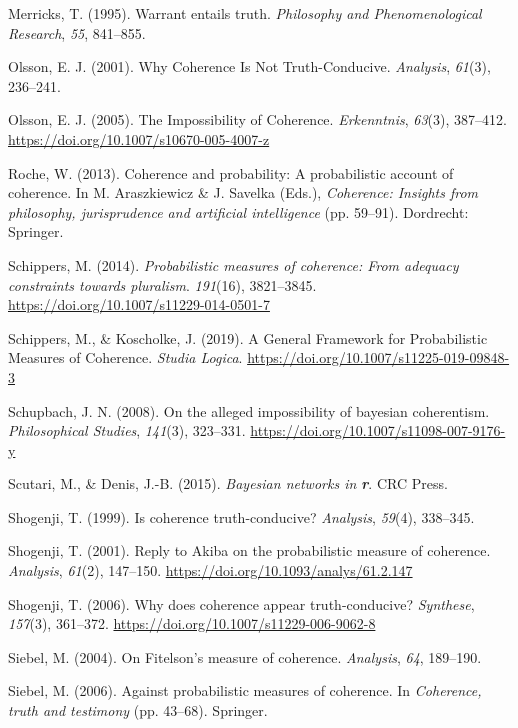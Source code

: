 \documentclass[
  10pt,
]{scrartcl}
\newlength{\cslhangindent}
\newlength{\cslentryspacingunit} %
\newenvironment{CSLReferences}[2] %
 {%
  \setlength{\parindent}{0pt}
  \ifodd #1
  \let\oldpar\par
  \def\par{\hangindent=\cslhangindent\oldpar}
  \fi
  \setlength{\parskip}{#2\cslentryspacingunit}
 }%
 {}
\begin{document}
\begin{CSLReferences}{1}{0}
\leavevmode{}%
Merricks, T. (1995). Warrant entails truth. \emph{Philosophy and Phenomenological Research}, \emph{55}, 841--855.

\leavevmode{}%
Olsson, E. J. (2001). Why {Coherence Is Not Truth}-{Conducive}. \emph{Analysis}, \emph{61}(3), 236--241.

\leavevmode{}%
Olsson, E. J. (2005). The {Impossibility} of {Coherence}. \emph{Erkenntnis}, \emph{63}(3), 387--412. \url{https://doi.org/10.1007/s10670-005-4007-z}

\leavevmode{}%
Roche, W. (2013). Coherence and probability: A probabilistic account of coherence. In M. Araszkiewicz \& J. Savelka (Eds.), \emph{Coherence: Insights from philosophy, jurisprudence and artificial intelligence} (pp. 59--91). Dordrecht: Springer.

\leavevmode{}%
Schippers, M. (2014). \emph{Probabilistic measures of coherence: From adequacy constraints towards pluralism}. \emph{191}(16), 3821--3845. \url{https://doi.org/10.1007/s11229-014-0501-7}

\leavevmode{}%
Schippers, M., \& Koscholke, J. (2019). A {General Framework} for {Probabilistic Measures} of {Coherence}. \emph{Studia Logica}. \url{https://doi.org/10.1007/s11225-019-09848-3}

\leavevmode{}%
Schupbach, J. N. (2008). On the alleged impossibility of bayesian coherentism. \emph{Philosophical Studies}, \emph{141}(3), 323--331. \url{https://doi.org/10.1007/s11098-007-9176-y}

\leavevmode{}%
Scutari, M., \& Denis, J.-B. (2015). \emph{Bayesian networks in \textbf{{r}}}. CRC Press.

\leavevmode{}%
Shogenji, T. (1999). Is coherence truth-conducive? \emph{Analysis}, \emph{59}(4), 338--345.

\leavevmode{}%
Shogenji, T. (2001). Reply to {A}kiba on the probabilistic measure of coherence. \emph{Analysis}, \emph{61}(2), 147--150. \url{https://doi.org/10.1093/analys/61.2.147}

\leavevmode{}%
Shogenji, T. (2006). Why does coherence appear truth-conducive? \emph{Synthese}, \emph{157}(3), 361--372. \url{https://doi.org/10.1007/s11229-006-9062-8}

\leavevmode{}%
Siebel, M. (2004). On {F}itelson's measure of coherence. \emph{Analysis}, \emph{64}, 189--190.

\leavevmode{}%
Siebel, M. (2006). Against probabilistic measures of coherence. In \emph{Coherence, truth and testimony} (pp. 43--68). Springer.

\end{CSLReferences}
\end{document}
